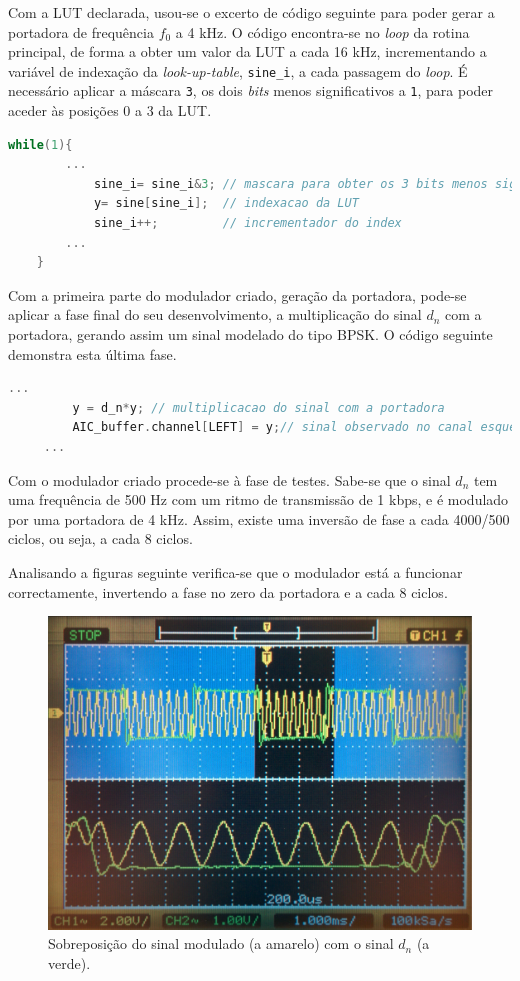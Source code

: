 \documentclass[11pt]{article}
\numberwithin{equation}{section}
\begin{document}
Com a LUT declarada, usou-se o excerto de código seguinte para poder gerar a portadora de frequência $f_0$ a 4 kHz. O código encontra-se no \textit{loop} da rotina principal, de forma a obter um valor da LUT a cada 16 kHz, incrementando a variável de indexação da \textit{look-up-table}, \texttt{sine\_i}, a cada passagem do \textit{loop}. É necessário aplicar a máscara \texttt{3}, os dois \textit{bits} menos significativos a \texttt{1}, para poder aceder às posições 0 a 3 da LUT.

\begin{lstlisting}[language=C]
	while(1){	
		...
			sine_i= sine_i&3; // mascara para obter os 3 bits menos significativos
			y= sine[sine_i];  // indexacao da LUT
			sine_i++;		  // incrementador do index
		...
	}
\end{lstlisting}

Com a primeira parte do modulador criado, geração da portadora, pode-se aplicar a fase final do seu desenvolvimento, a multiplicação do sinal $d_n$ com a portadora, gerando assim um sinal modelado do tipo BPSK. O código seguinte demonstra esta última fase.  

\begin{lstlisting}[language=C]
	 ...
		 y = d_n*y; // multiplicacao do sinal com a portadora
		 AIC_buffer.channel[LEFT] = y;// sinal observado no canal esquerdo
	 ...
\end{lstlisting}

Com o modulador criado procede-se à fase de testes. Sabe-se que o sinal $d_n$ tem uma frequência de 500 Hz com um ritmo de transmissão de 1 kbps, e é modulado por uma portadora de 4 kHz. Assim, existe uma inversão de fase a cada 4000/500 ciclos, ou seja, a cada 8 ciclos.

Analisando a figuras seguinte verifica-se que o modulador está a funcionar correctamente, invertendo a fase no zero da portadora e a cada 8 ciclos.

\begin{figure}[H]
	\centering
	\includegraphics[keepaspectratio=true, scale=0.10]{exps/dn_com_y}
	\caption{Sobreposição do sinal modulado (a amarelo) com o sinal $d_n$ (a verde).}
	\vspace{-0.8em}
\end{figure}
\end{document}
